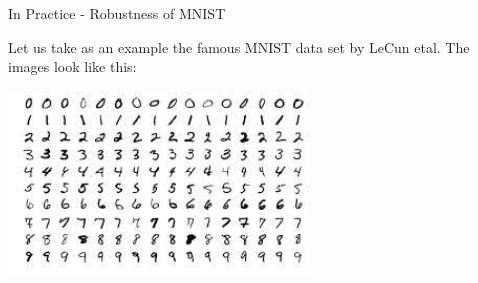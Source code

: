 \documentclass[t,compress,aspectratio=169]{beamer}
\begin{document}
\begin{frame}{In Practice - Robustness of MNIST}

    Let us take as an example the famous MNIST data set by LeCun etal. The images look like this:

    \centering
    \includegraphics[width=0.6\textwidth]{img/MNIST.jpeg}


\end{frame}






\end{document}
